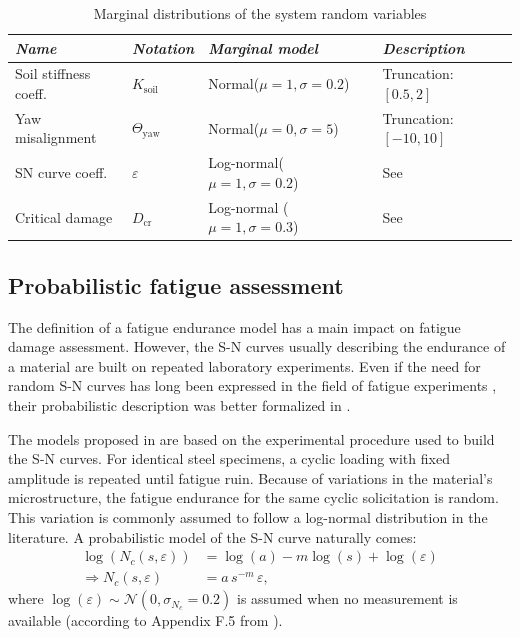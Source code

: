 \begin{table}[h!]
    \centering
    \begin{tabular}{llll}
        \hline
        {\it Name} & {\it Notation} & {\it Marginal model} & {\it Description}\\
        \hline
        Soil stiffness coeff. & $K_{\mathrm{soil}}$ & Normal($\mu=1, \sigma=0.2$) & Truncation: $[0.5, 2]$\\
        Yaw misalignment & $\Theta_{\mathrm{yaw}}$ & Normal($\mu=0, \sigma=5$) & Truncation: $[-10, 10]$\\
        SN curve coeff. & $\varepsilon$ & Log-normal($\mu=1, \sigma=0.2$) & See \cite{guede_2007}\\
        Critical damage & $D_{\mathrm{cr}}$ & Log-normal ($\mu=1, \sigma=0.3$) & See \cite{drexler_musculus_2021}\\\hline
    \end{tabular}
    \caption{Marginal distributions of the system random variables}
    \label{tab:sys_variables}
\end{table}



\subsection{Probabilistic fatigue assessment}\label{sec:probabilistic_sn}
The definition of a fatigue endurance model has a main impact on fatigue damage assessment. 
However, the S-N curves usually describing the endurance of a material are built on repeated laboratory experiments. 
Even if the need for random S-N curves has long been expressed in the field of fatigue experiments \citep{lieurade_1982_essais_fatigue}, their probabilistic description was better formalized in \citep{guede_2007,sudret_2013_fatigue}. 

The models proposed in \citet{guede_2007} are based on the experimental procedure used to build the S-N curves. 
For identical steel specimens, a cyclic loading with fixed amplitude is repeated until fatigue ruin. 
Because of variations in the material's microstructure, the fatigue endurance for the same cyclic solicitation is random. 
This variation is commonly assumed to follow a log-normal distribution in the literature. 
A probabilistic model of the S-N curve naturally comes: 
\begin{subequations}
    \begin{align}
        \log(N_c(s, \varepsilon)) &= \log(a) - m \log(s) + \log(\varepsilon)\\
        \Rightarrow N_c(s, \varepsilon) &= a \, s^{-m} \, \varepsilon,
    \end{align}
\end{subequations}
where $\log(\varepsilon) \sim \mathcal{N}(0, \sigma_{N_c}=0.2)$ is assumed when no measurement is available (according to Appendix F.5 from \citealp{dnv_fatigue_2016}). 

